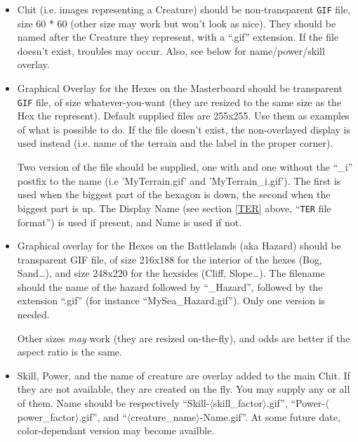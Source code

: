 \documentclass{article}
\begin{document}
\begin{itemize}
\item Chit (i.e. images representing a Creature) should be non-transparent \texttt{GIF} file, size 60 * 60 (other size may work but won't look as nice). They should be named after the Creature they represent, with a ``.gif'' extension. If the file doesn't exist, troubles may occur. Also, see below for name/power/skill overlay.

\item Graphical Overlay for the Hexes on the Masterboard should be transparent \texttt{GIF} file, of size whatever-you-want (they are resized to the same size as the Hex the represent). Default supplied files are 255x255. Use them as examples of what is possible to do. If the file doesn't exist, the non-overlayed display is used instead (i.e. name of the terrain and the label in the proper corner).

Two version of the file should be supplied, one with and one without the ``\_i'' postfix to the name (i.e 'MyTerrain.gif' and 'MyTerrain\_i.gif'). The first is used when the biggest part of the hexagon is down, the second when the biggest part is up. The Display Name (see section \ref{TER} above, ``\texttt{TER} file format'') is used if present, and Name is used if not.

\item Graphical overlay for the Hexes on the Battlelands (aka Hazard) should be transparent GIF file, of size 216x188 for the interior of the hexes (Bog, Sand\ldots), and size 248x220 for the hexsides (Cliff, Slope\ldots). The filename should the name of the hazard followed by ``\_Hazard'', followed by the extension ``.gif'' (for instance ``MySea\_Hazard.gif''). Only one version is needed.

Other sizes \emph{may} work (they are resized on-the-fly), and odds are better if the aspect ratio is the same.

\item Skill, Power, and the name of creature are overlay added to the main Chit. If they are not available, they are created on the fly. You may supply any or all of them. Name should be respectively ``Skill-$\langle$skill_factor$\rangle$.gif'', ``Power-$\langle$power_factor$\rangle$.gif'', and ``$\langle$creature_name$\rangle$-Name.gif''. At some future date, color-dependant version may become availble.

\end{itemize}
\end{document}
